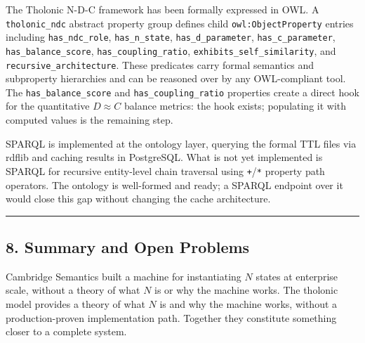 \documentclass[
  11pt,
  letterpaper,
]{article}
\begin{document}
The Tholonic N-D-C framework has been formally expressed in OWL. A
\texttt{tholonic\_ndc} abstract property group defines child
\texttt{owl:ObjectProperty} entries including \texttt{has\_ndc\_role},
\texttt{has\_n\_state}, \texttt{has\_d\_parameter},
\texttt{has\_c\_parameter}, \texttt{has\_balance\_score},
\texttt{has\_coupling\_ratio}, \texttt{exhibits\_self\_similarity}, and
\texttt{recursive\_architecture}. These predicates carry formal
semantics and subproperty hierarchies and can be reasoned over by any
OWL-compliant tool. The \texttt{has\_balance\_score} and
\texttt{has\_coupling\_ratio} properties create a direct hook for the
quantitative \(D \approx C\) balance metrics: the hook exists;
populating it with computed values is the remaining step.

SPARQL is implemented at the ontology layer, querying the formal TTL
files via rdflib and caching results in PostgreSQL. What is not yet
implemented is SPARQL for recursive entity-level chain traversal using
\texttt{+}/\texttt{*} property path operators. The ontology is
well-formed and ready; a SPARQL endpoint over it would close this gap
without changing the cache architecture.

\begin{center}\rule{0.5\linewidth}{0.5pt}\end{center}

\subsection{8. Summary and Open
Problems}\label{summary-and-open-problems}

Cambridge Semantics built a machine for instantiating \(N\) states at
enterprise scale, without a theory of what \(N\) is or why the machine
works. The tholonic model provides a theory of what \(N\) is and why the
machine works, without a production-proven implementation path. Together
they constitute something closer to a complete system.
\end{document}
